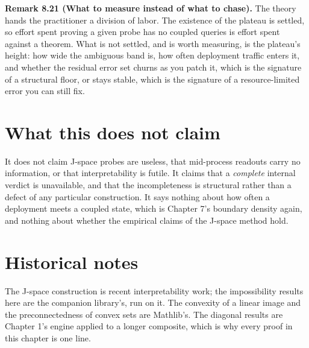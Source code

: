 \documentclass{memoir}
\begin{document}
\textbf{Remark 8.21 (What to measure instead of what to chase).} The theory hands the
practitioner a division of labor. The existence of the plateau is settled, so
effort spent proving a given probe has no coupled queries is effort spent
against a theorem. What is not settled, and is worth measuring, is the plateau's
height: how wide the ambiguous band is, how often deployment traffic enters it,
and whether the residual error set churns as you patch it, which is the
signature of a structural floor, or stays stable, which is the signature of a
resource-limited error you can still fix.



\section{What this does not claim}\label{Two--Schemas--of--Impossibility-005F-005F-005F--Machine--Checked--Limits--of--Trustworthy--Machine--Learning-005F-005F-005F--and--Why--They--Tighten--with--Capability----J--Space-005F-005F-005F--and--Why--It--Does--Not--Escape----What--this--does--not--claim}

It does not claim J-space probes are useless, that mid-process readouts carry no
information, or that interpretability is futile. It claims that a \emph{complete}
internal verdict is unavailable, and that the incompleteness is structural
rather than a defect of any particular construction. It says nothing about how
often a deployment meets a coupled state, which is Chapter 7's boundary density
again, and nothing about whether the empirical claims of the J-space method
hold.



\section{Historical notes}\label{Two--Schemas--of--Impossibility-005F-005F-005F--Machine--Checked--Limits--of--Trustworthy--Machine--Learning-005F-005F-005F--and--Why--They--Tighten--with--Capability----J--Space-005F-005F-005F--and--Why--It--Does--Not--Escape----Historical--notes}

The J-space construction is recent interpretability work; the impossibility
results here are the companion library's, run on it. The convexity of a linear
image and the preconnectedness of convex sets are Mathlib's. The diagonal
results are Chapter 1's engine applied to a longer composite, which is why every
proof in this chapter is one line.
\end{document}
